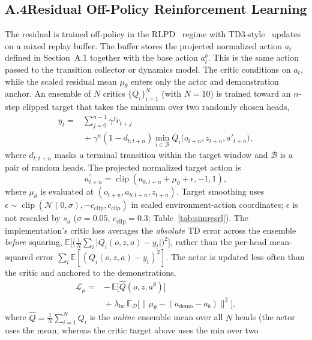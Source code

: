 \documentclass[letterpaper]{article} %
\begin{document}
\subsection{A.4\quad Residual Off-Policy Reinforcement Learning}

The residual is trained off-policy in the RLPD~\cite{ball2023efficient} regime
with TD3-style~\cite{fujimoto2018addressing} updates on a mixed replay buffer.
The buffer stores the projected normalized action $a_t$ defined in
Section~A.1 together with the base action $a_t^b$. This is the same action
passed to the transition collector or dynamics model. The critic conditions
on $a_t$, while the scaled residual mean $\mu_\theta$ enters only the actor and
demonstration anchor. An
ensemble of $N$ critics $\{Q_i\}_{i=1}^{N}$ (with $N=10$) is
trained toward an $n$-step clipped target that takes the minimum over two randomly chosen
heads,
\[
\begin{aligned}
y_t={}&\sum_{j=0}^{n-1}\gamma^j\tilde r_{t+j}\\
&{}+\gamma^n(1-d_{t:t+n})\min_{i\in\mathcal{B}}\bar Q_i\big(o_{t+n},z_{t+n},a'_{t+n}\big),
\end{aligned}
\]
where $d_{t:t+n}$ masks a terminal transition within the target window and
$\mathcal B$ is a pair of random heads. The projected normalized target action
is
\[
a^{\prime}_{t+n}=\operatorname{clip}\!\left(
 a_{b,t+n}+\mu_{\bar\theta}+\epsilon,-1,1
\right),
\]
where $\mu_{\bar\theta}$ is evaluated at
$(o_{t+n},a_{b,t+n},z_{t+n})$. Target smoothing uses
$\epsilon\sim\operatorname{clip}(\mathcal N(0,\sigma),
-c_{\mathrm{clip}},c_{\mathrm{clip}})$ in scaled environment-action
coordinates; $\epsilon$ is not rescaled by $s_a$
($\sigma=0.05$, $c_{\mathrm{clip}}=0.3$;
Table~\ref{tab:simresrl}). The implementation's critic
loss averages the \emph{absolute} TD error across the ensemble \emph{before} squaring,
$\mathbb{E}\big[\big(\tfrac1N\sum_i\lvert Q_i(o,z,a)-y_t\rvert\big)^2\big]$, rather than the
per-head mean-squared error $\sum_i\mathbb{E}[(Q_i(o,z,a)-y_t)^2]$. The actor is updated less often
than the critic and anchored to the demonstrations,
\[
\begin{aligned}
\mathcal{L}_{\mu}={}&-\,\mathbb{E}\big[\hat Q(o,z,a^\theta)\big]\\
&{}+\lambda_{\mathrm{bc}}\,\mathbb{E}_{\mathcal{D}}
\big[\lVert \mu_\theta-(a_{\mathrm{demo}}-a_b)\rVert^2\big],
\end{aligned}
\]
where $\hat Q=\tfrac1N\sum_{i=1}^{N}Q_i$ is the \emph{online} ensemble mean over all $N$
heads (the actor uses the mean, whereas the critic target above uses the min over two
\end{document}
